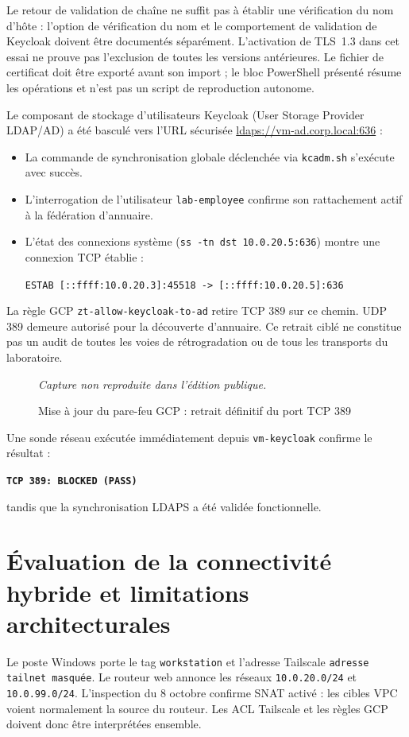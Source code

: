 \documentclass[a4paper,12pt]{report}
\newcommand{\publiccapture}[1]{%
  \begin{figure}[H]\centering
  {\footnotesize\itshape Capture non reproduite dans l'édition publique.}
  \caption{#1}\end{figure}}
\begin{document}
Le retour de validation de chaîne ne suffit pas à établir une vérification du nom d'hôte : l'option de vérification du nom et le comportement de validation de Keycloak doivent être documentés séparément. L'activation de TLS~1.3 dans cet essai ne prouve pas l'exclusion de toutes les versions antérieures. Le fichier de certificat doit être exporté avant son import ; le bloc PowerShell présenté résume les opérations et n'est pas un script de reproduction autonome.


Le composant de stockage d'utilisateurs Keycloak (User Storage Provider LDAP/AD) a été basculé vers l'URL sécurisée \url{ldaps://vm-ad.corp.local:636} :
\begin{itemize}
\item La commande de synchronisation globale déclenchée via \texttt{kcadm.sh} s'exécute avec succès.
\item L'interrogation de l'utilisateur \texttt{lab-employee} confirme son rattachement actif à la fédération d'annuaire.
\item L'état des connexions système (\texttt{ss -tn dst 10.0.20.5:636}) montre une connexion TCP établie :
\begin{center}\small\texttt{ESTAB [::ffff:10.0.20.3]:45518 -> [::ffff:10.0.20.5]:636}\end{center}
\end{itemize}

La règle GCP \texttt{zt-allow-keycloak-to-ad} retire TCP 389 sur ce chemin. UDP 389 demeure autorisé pour la découverte d'annuaire. Ce retrait ciblé ne constitue pas un audit de toutes les voies de rétrogradation ou de tous les transports du laboratoire.

\publiccapture{Mise à jour du pare-feu GCP : retrait définitif du port TCP 389}

Une sonde réseau exécutée immédiatement depuis \texttt{vm-keycloak} confirme le résultat :
\begin{center}\textbf{\texttt{TCP 389: BLOCKED (PASS)}}\end{center}
tandis que la synchronisation LDAPS a été validée fonctionnelle.

\section{Évaluation de la connectivité hybride et limitations architecturales}
\label{sec:p4-hybrid}
Le poste Windows porte le tag \texttt{workstation} et l'adresse Tailscale \texttt{adresse tailnet masquée}. Le routeur web annonce les réseaux \texttt{10.0.20.0/24} et \texttt{10.0.99.0/24}. L'inspection du 8 octobre confirme SNAT activé : les cibles VPC voient normalement la source du routeur. Les ACL Tailscale et les règles GCP doivent donc être interprétées ensemble.
\end{document}
